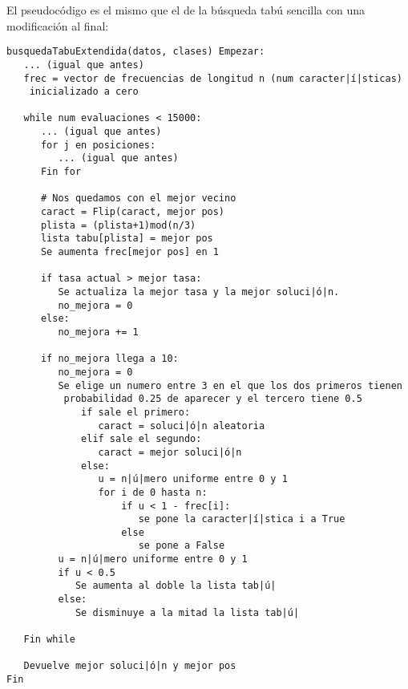 \documentclass[12pt]{article}
\begin{document}
El pseudocódigo es el mismo que el de la búsqueda tabú sencilla con una modificación al final:

\begin{lstlisting}
busquedaTabuExtendida(datos, clases) Empezar:
   ... (igual que antes)
   frec = vector de frecuencias de longitud n (num caracter|í|sticas)
    inicializado a cero

   while num evaluaciones < 15000:
      ... (igual que antes)
      for j en posiciones:
         ... (igual que antes)
      Fin for
   
      # Nos quedamos con el mejor vecino
      caract = Flip(caract, mejor pos)
      plista = (plista+1)mod(n/3)
      lista tabu[plista] = mejor pos
      Se aumenta frec[mejor pos] en 1   
   
      if tasa actual > mejor tasa:
         Se actualiza la mejor tasa y la mejor soluci|ó|n.
         no_mejora = 0
      else:
         no_mejora += 1
   
      if no_mejora llega a 10:
         no_mejora = 0
         Se elige un numero entre 3 en el que los dos primeros tienen
          probabilidad 0.25 de aparecer y el tercero tiene 0.5
             if sale el primero:
                caract = soluci|ó|n aleatoria
             elif sale el segundo:
                caract = mejor soluci|ó|n
             else:
                u = n|ú|mero uniforme entre 0 y 1
                for i de 0 hasta n:
                    if u < 1 - frec[i]:
                       se pone la caracter|í|stica i a True
                    else
                       se pone a False
         u = n|ú|mero uniforme entre 0 y 1
         if u < 0.5
            Se aumenta al doble la lista tab|ú|
         else:
            Se disminuye a la mitad la lista tab|ú|

   Fin while
   
   Devuelve mejor soluci|ó|n y mejor pos
Fin

\end{lstlisting}

\newpage
\end{document}
